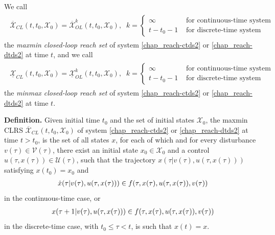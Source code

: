 \documentclass[letterpaper,10pt,english]{sphinxmanual}
\begin{document}
We call
\label{chap_reach:equation-maxminclrs}\begin{gather}
\begin{split}\overline{{\mathcal X}}_{CL}(t, t_0, {\mathcal X}_0) = \overline{{\mathcal X}}_{OL}^k(t, t_0, {\mathcal X}_0), \;\;
k = \left\{\begin{array}{ll}
\infty & \mbox{ for continuous-time system}\\
t-t_0-1 & \mbox{ for discrete-time system}\end{array}\right.\end{split}\label{chap_reach-maxminclrs}
\end{gather}
the \emph{maxmin closed-loop reach set} of system \eqref{chap_reach-ctds2} or \eqref{chap_reach-dtds2} at
time $t$, and we call
\label{chap_reach:equation-minmaxclrs}\begin{gather}
\begin{split}\underline{{\mathcal X}}_{CL}(t, t_0, {\mathcal X}_0) = \underline{{\mathcal X}}_{OL}^k(t, t_0, {\mathcal X}_0), \;\;
k = \left\{\begin{array}{ll}
\infty & \mbox{ for continuous-time system}\\
t-t_0-1 & \mbox{ for discrete-time system}\end{array}\right.\end{split}\label{chap_reach-minmaxclrs}
\end{gather}
the \emph{minmax closed-loop reach set} of system \eqref{chap_reach-ctds2} or \eqref{chap_reach-dtds2} at
time $t$.

\textbf{Definition.} Given initial time $t_0$ and the set of initial
states ${\mathcal X}_0$, the maxmin CLRS
$\overline{{\mathcal X}}_{CL}(t, t_0, {\mathcal X}_0)$ of system
\eqref{chap_reach-ctds2} or \eqref{chap_reach-dtds2} at time $t>t_0$, is the set of all states
$x$, for each of which and for every disturbance
$v(\tau)\in{\mathcal V}(\tau)$, there exist an initial state
$x_0\in{\mathcal X}_0$ and a control
$u(\tau, x(\tau))\in{\mathcal U}(\tau)$, such that the trajectory
$x(\tau | v(\tau), u(\tau, x(\tau)))$ satisfying
$x(t_0) = x_0$ and
\begin{gather}
\begin{split}\dot{x}(\tau | v(\tau), u(\tau, x(\tau))) \in
f(\tau, x(\tau), u(\tau, x(\tau)), v(\tau))\end{split}\notag
\end{gather}
in the continuous-time case, or
\begin{gather}
\begin{split}x(\tau+1 | v(\tau), u(\tau, x(\tau))) \in
f(\tau, x(\tau), u(\tau, x(\tau)), v(\tau))\end{split}\notag
\end{gather}
in the discrete-time case, with $t_0\leqslant\tau<t$, is such
that $x(t)=x$.
\end{document}
